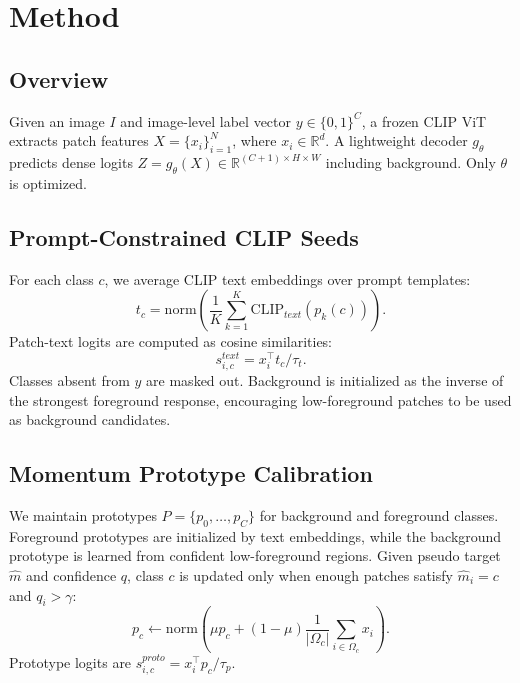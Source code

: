 \documentclass[letterpaper]{article}
\begin{document}
\section{Method}
\subsection{Overview}
Given an image $I$ and image-level label vector $y \in \{0,1\}^{C}$, a frozen
CLIP ViT extracts patch features $X=\{x_i\}_{i=1}^{N}$, where
$x_i \in \mathbb{R}^{d}$. A lightweight decoder $g_\theta$ predicts dense logits
$Z=g_\theta(X) \in \mathbb{R}^{(C+1)\times H \times W}$ including background.
Only $\theta$ is optimized.

\subsection{Prompt-Constrained CLIP Seeds}
For each class $c$, we average CLIP text embeddings over prompt templates:
\begin{equation}
t_c = \mathrm{norm}\left(\frac{1}{K}\sum_{k=1}^{K}
\mathrm{CLIP}_{text}(p_k(c))\right).
\end{equation}
Patch-text logits are computed as cosine similarities:
\begin{equation}
s^{text}_{i,c} = x_i^\top t_c / \tau_t.
\end{equation}
Classes absent from $y$ are masked out. Background is initialized as the inverse
of the strongest foreground response, encouraging low-foreground patches to be
used as background candidates.

\subsection{Momentum Prototype Calibration}
We maintain prototypes $P=\{p_0,\ldots,p_C\}$ for background and foreground
classes. Foreground prototypes are initialized by text embeddings, while the
background prototype is learned from confident low-foreground regions. Given
pseudo target $\hat{m}$ and confidence $q$, class $c$ is updated only when enough
patches satisfy $\hat{m}_i=c$ and $q_i>\gamma$:
\begin{equation}
p_c \leftarrow \mathrm{norm}\left(\mu p_c + (1-\mu)
\frac{1}{|\Omega_c|}\sum_{i\in\Omega_c} x_i\right).
\end{equation}
Prototype logits are $s^{proto}_{i,c}=x_i^\top p_c/\tau_p$.
\end{document}
